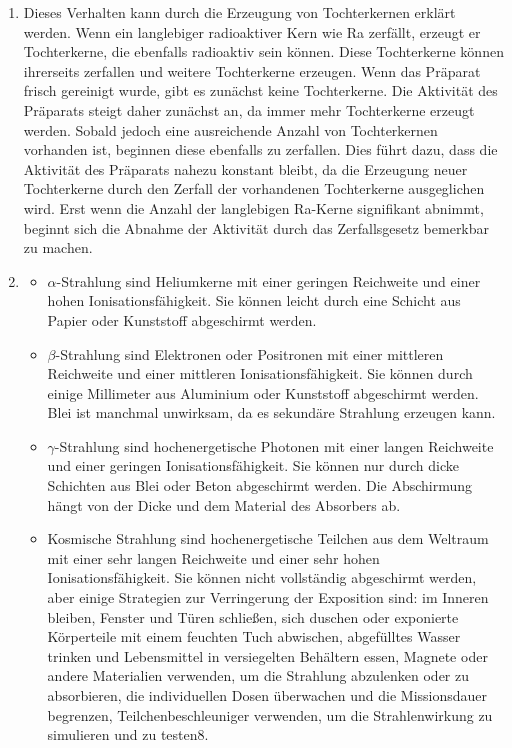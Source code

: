 \documentclass[11pt, a4paper]{article}
\begin{document}
\begin{enumerate}
        \item Dieses Verhalten kann durch die Erzeugung von Tochterkernen erklärt werden. Wenn ein langlebiger radioaktiver Kern wie Ra zerfällt, erzeugt er Tochterkerne, die ebenfalls radioaktiv sein können. Diese Tochterkerne können ihrerseits zerfallen und weitere Tochterkerne erzeugen.
        Wenn das Präparat frisch gereinigt wurde, gibt es zunächst keine Tochterkerne. Die Aktivität des Präparats steigt daher zunächst an, da immer mehr Tochterkerne erzeugt werden. Sobald jedoch eine ausreichende Anzahl von Tochterkernen vorhanden ist, beginnen diese ebenfalls zu zerfallen. Dies führt dazu, dass die Aktivität des Präparats nahezu konstant bleibt, da die Erzeugung neuer Tochterkerne durch den Zerfall der vorhandenen Tochterkerne ausgeglichen wird.
        Erst wenn die Anzahl der langlebigen Ra-Kerne signifikant abnimmt, beginnt sich die Abnahme der Aktivität durch das Zerfallsgesetz bemerkbar zu machen.
        \item \begin{itemize} \item $\alpha$-Strahlung sind Heliumkerne mit einer geringen Reichweite und einer hohen Ionisationsfähigkeit. Sie können leicht durch eine Schicht aus Papier oder Kunststoff abgeschirmt werden. \item $\beta$-Strahlung sind Elektronen oder Positronen mit einer mittleren Reichweite und einer mittleren Ionisationsfähigkeit. Sie können durch einige Millimeter aus Aluminium oder Kunststoff abgeschirmt werden. Blei ist manchmal unwirksam, da es sekundäre Strahlung erzeugen kann. \item $\gamma$-Strahlung sind hochenergetische Photonen mit einer langen Reichweite und einer geringen Ionisationsfähigkeit. Sie können nur durch dicke Schichten aus Blei oder Beton abgeschirmt werden. Die Abschirmung hängt von der Dicke und dem Material des Absorbers ab. \item Kosmische Strahlung sind hochenergetische Teilchen aus dem Weltraum mit einer sehr langen Reichweite und einer sehr hohen Ionisationsfähigkeit. Sie können nicht vollständig abgeschirmt werden, aber einige Strategien zur Verringerung der Exposition sind: im Inneren bleiben, Fenster und Türen schließen, sich duschen oder exponierte Körperteile mit einem feuchten Tuch abwischen, abgefülltes Wasser trinken und Lebensmittel in versiegelten Behältern essen, Magnete oder andere Materialien verwenden, um die Strahlung abzulenken oder zu absorbieren, die individuellen Dosen überwachen und die Missionsdauer begrenzen, Teilchenbeschleuniger verwenden, um die Strahlenwirkung zu simulieren und zu testen8. \end{itemize}

\end{enumerate}
\end{document}
